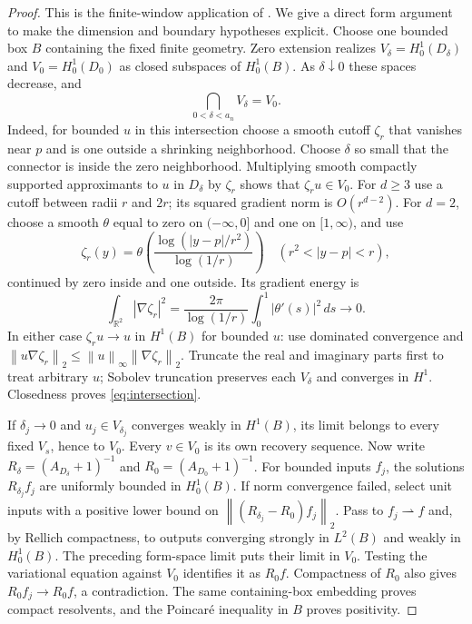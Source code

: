 \documentclass[11pt]{article}
\newcommand{\R}{\mathbb R}
\newcommand{\norm}[1]{\left\lVert #1\right\rVert}
\begin{document}
\begin{proof}
This is the finite-window application of
\cite[Propositions~2.2--2.3 and Section~3]{KL}. We give a direct form
argument to make the dimension and boundary hypotheses explicit.
Choose one bounded box $B$ containing the fixed finite geometry.
Zero extension realizes $V_\delta=H_0^1(D_\delta)$ and
$V_0=H_0^1(D_0)$ as closed subspaces of $H_0^1(B)$.
As $\delta\downarrow0$ these spaces decrease, and
\begin{equation}\label{eq:intersection}
 \bigcap_{0<\delta<a_n}V_\delta=V_0.
\end{equation}
Indeed, for bounded $u$ in this intersection choose a smooth cutoff
$\zeta_r$ that vanishes near $p$ and is one outside a shrinking
neighborhood. Choose $\delta$ so small that the connector is inside the
zero neighborhood. Multiplying smooth compactly supported approximants
to $u$ in $D_\delta$ by $\zeta_r$ shows that $\zeta_r u\in V_0$.
For $d\ge3$ use a cutoff between radii $r$ and $2r$; its squared gradient
norm is $O(r^{d-2})$. For $d=2$, choose a smooth $\theta$ equal to zero
on $(-\infty,0]$ and one on $[1,\infty)$, and use
\[
 \zeta_r(y)=
 \theta\!\left(\frac{\log(|y-p|/r^2)}{\log(1/r)}\right)
 \quad(r^2<|y-p|<r),
\]
continued by zero inside and one outside. Its gradient energy is
\[
 \int_{\R^2}|\nabla\zeta_r|^2
 =\frac{2\pi}{\log(1/r)}
       \int_0^1|\theta'(s)|^2\,ds\longrightarrow0.
\]
In either case $\zeta_r u\to u$ in $H^1(B)$ for bounded $u$:
use dominated convergence and
$\norm{u\nabla\zeta_r}_2\le\norm{u}_\infty\norm{\nabla\zeta_r}_2$.
Truncate the real and imaginary parts first to treat arbitrary $u$;
Sobolev truncation preserves each $V_\delta$ and converges in $H^1$.
Closedness proves \eqref{eq:intersection}.

If $\delta_j\to0$ and $u_j\in V_{\delta_j}$ converges weakly in $H^1(B)$,
its limit belongs to every fixed $V_s$, hence to $V_0$.
Every $v\in V_0$ is its own recovery sequence.
Now write $R_\delta=(A_{D_\delta}+1)^{-1}$ and
$R_0=(A_{D_0}+1)^{-1}$. For bounded inputs $f_j$,
the solutions $R_{\delta_j}f_j$ are uniformly bounded in $H_0^1(B)$.
If norm convergence failed, select unit inputs with a positive lower
bound on $\norm{(R_{\delta_j}-R_0)f_j}_2$.
Pass to $f_j\rightharpoonup f$ and, by Rellich compactness, to outputs
converging strongly in $L^2(B)$ and weakly in $H_0^1(B)$.
The preceding form-space limit puts their limit in $V_0$.
Testing the variational equation against $V_0$ identifies it as $R_0f$.
Compactness of $R_0$ also gives $R_0f_j\to R_0f$, a contradiction.
The same containing-box embedding proves compact resolvents, and the
Poincar\'e inequality in $B$ proves positivity.
\end{proof}
\end{document}
